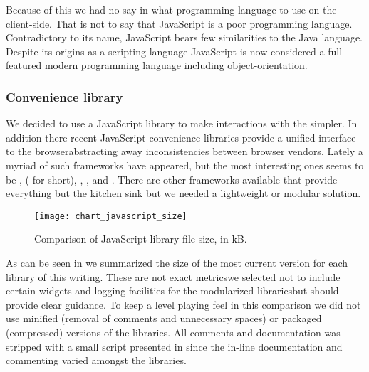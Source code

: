 Because of this we had no say in what programming language to use on the
client-side. That is not to say that JavaScript is a poor programming
language. Contradictory to its name, JavaScript bears few similarities to the
Java language.%
Despite its origins as a scripting language JavaScript is now considered
a full-featured modern programming language
 including object-orientation.

\subsubsection{Convenience library}

We decided to use a JavaScript library to make interactions with the
 simpler.
In addition there recent JavaScript convenience libraries provide a
unified interface to the browser\dash{}abstracting away inconsistencies
between browser vendors. Lately a myriad of such frameworks have appeared,
but the most interesting ones seems to be
,
 ( for short),
,
, and
.%
There are other frameworks available that provide everything but the kitchen
sink but we needed a lightweight or modular solution.

\begin{figure}
  \texttt{[image: chart\_javascript\_size]}
  \caption[JavaScript Library Comparison]{%
    Comparison of JavaScript library file size, in kB.
  }
  \label{figure:chart.javascript.size}
\end{figure}

As can be seen in
we summarized the size of the most
current version for each library of this writing. These are not exact
metrics\dash{}we selected not to include certain widgets and logging
facilities for the modularized libraries\dash{}but should provide clear
guidance. To keep a level playing feel in this comparison we did not use
minified (removal of comments and unnecessary spaces) or packaged (compressed)
versions of the libraries. All comments and documentation was stripped with a
small script presented in 
since the in-line documentation and commenting varied amongst the libraries.

